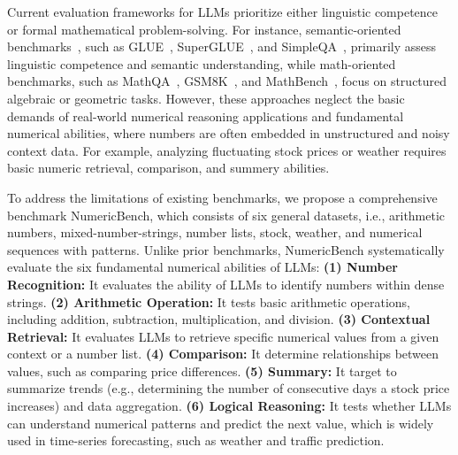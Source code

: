 Current evaluation frameworks for LLMs prioritize either linguistic competence or formal mathematical problem-solving. 
For instance, 
semantic-oriented benchmarks~\citep{vulic-etal-2020-probing}, such as GLUE~\citep{wang2018glue}, 
SuperGLUE~\citep{wang2019superglue}, 
and SimpleQA~\citep{wei2024measuring}, 
primarily assess linguistic competence and semantic understanding, 
while math-oriented benchmarks, such as MathQA~\citep{amini2019mathqa}, 
GSM8K~\citep{cobbe2021training}, 
and MathBench~\citep{liu2024mathbench},
focus on structured algebraic or geometric tasks. 
However, these approaches neglect the basic demands of real-world numerical reasoning applications and fundamental numerical abilities, 
where numbers are often embedded in unstructured and noisy context data. 
For example, analyzing fluctuating stock prices or weather   requires basic  numeric retrieval, comparison, and summery abilities.




To address the limitations of existing benchmarks, we propose  a comprehensive benchmark  NumericBench, 
which consists of six general datasets, i.e., arithmetic numbers, mixed-number-strings, number lists, stock, weather, and numerical sequences with patterns.
Unlike prior benchmarks, NumericBench 
systematically evaluate the six fundamental numerical abilities of LLMs:
\textbf{(1) Number Recognition:} 
It evaluates the ability of LLMs to identify numbers within dense strings.
\textbf{(2) Arithmetic Operation:} 
It tests basic arithmetic operations, including addition, subtraction, multiplication, and division.
\textbf{(3) Contextual Retrieval:}
It evaluates LLMs to retrieve specific numerical values from a given context or a number list.
\textbf{(4) Comparison:}
It determine relationships between values, such as comparing price differences.
\textbf{(5) Summary:}
It target to summarize trends (e.g., determining the number of consecutive days a stock price increases) and data aggregation.
\textbf{(6) Logical Reasoning:}
It tests whether LLMs can understand numerical patterns and predict the next value, which is widely used in time-series forecasting, such as weather and traffic prediction.



